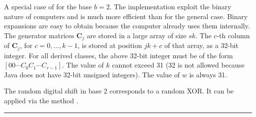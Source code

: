 
A special case of  for the base $b=2$.
The implementation exploit the binary nature of
computers and is much more efficient than for the general case.
Binary expansions are easy to obtain because the computer already
uses them internally.
The generator matrices $\mathbf{C}_j$ are stored in a large array of size $sk$.
The $c$-th column of $\mathbf{C}_j$, for $c=0,\dots,k-1$,
is stored at position $jk + c$ of that array, as a 32-bit integer.
For all derived classes, the above 32-bit integer must be of the form
        $ [0 0 \cdots C_0 C_1 \cdots C_{r-1}]$.
The value of $k$ cannot exceed 31 (32 is not allowed because Java does
not have 32-bit unsigned integers). The value of $w$ is always 31.

The random digital shift in base 2 corresponds to a random XOR.
It can be applied via the method .


\bigskip\hrule\bigskip

